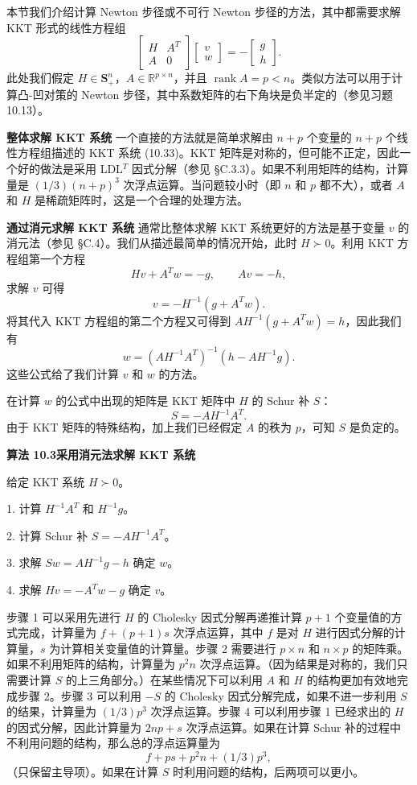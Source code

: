 \documentclass[UTF8,12pt,a4paper,fontset=fandol]{ctexart}
\begin{document}
本节我们介绍计算 Newton 步径或不可行 Newton 步径的方法，其中都需要求解 KKT 形式的线性方程组
\begin{equation}
\begin{bmatrix}
H&A^T\\
A&0
\end{bmatrix}
\begin{bmatrix}
v\\
w
\end{bmatrix}
=-
\begin{bmatrix}
g\\
h
\end{bmatrix}.
\tag{10.33}
\end{equation}
此处我们假定 $H\in\mathbf{S}_+^n$，$A\in\mathbb{R}^{p\times n}$，并且 $\operatorname{rank}A=p<n$。类似方法可以用于计算凸-凹对策的 Newton 步径，其中系数矩阵的右下角块是负半定的（参见习题 10.13）。

\noindent\textbf{整体求解 KKT 系统}\quad
一个直接的方法就是简单求解由 $n+p$ 个变量的 $n+p$ 个线性方程组描述的 KKT 系统 (10.33)。KKT 矩阵是对称的，但可能不正定，因此一个好的做法是采用 LDL$^T$ 因式分解（参见 \S C.3.3）。如果不利用矩阵的结构，计算量是 $(1/3)(n+p)^3$ 次浮点运算。当问题较小时（即 $n$ 和 $p$ 都不大），或者 $A$ 和 $H$ 是稀疏矩阵时，这是一个合理的处理方法。

\noindent\textbf{通过消元求解 KKT 系统}\quad
通常比整体求解 KKT 系统更好的方法是基于变量 $v$ 的消元法（参见 \S C.4）。我们从描述最简单的情况开始，此时 $H\succ 0$。利用 KKT 方程组第一个方程
\[
Hv+A^Tw=-g,\qquad Av=-h,
\]
求解 $v$ 可得
\[
v=-H^{-1}(g+A^Tw).
\]
将其代入 KKT 方程组的第二个方程又可得到 $AH^{-1}(g+A^Tw)=h$，因此我们有
\[
w=(AH^{-1}A^T)^{-1}(h-AH^{-1}g).
\]
这些公式给了我们计算 $v$ 和 $w$ 的方法。

在计算 $w$ 的公式中出现的矩阵是 KKT 矩阵中 $H$ 的 Schur 补 $S$：
\[
S=-AH^{-1}A^T.
\]
由于 KKT 矩阵的特殊结构，加上我们已经假定 $A$ 的秩为 $p$，可知 $S$ 是负定的。

\noindent\textbf{算法 10.3\quad 采用消元法求解 KKT 系统}

给定 KKT 系统 $H\succ0$。

1. 计算 $H^{-1}A^T$ 和 $H^{-1}g$。

2. 计算 Schur 补 $S=-AH^{-1}A^T$。

3. 求解 $Sw=AH^{-1}g-h$ 确定 $w$。

4. 求解 $Hv=-A^Tw-g$ 确定 $v$。

步骤 1 可以采用先进行 $H$ 的 Cholesky 因式分解再递推计算 $p+1$ 个变量值的方式完成，计算量为 $f+(p+1)s$ 次浮点运算，其中 $f$ 是对 $H$ 进行因式分解的计算量，$s$ 为计算相关变量值的计算量。步骤 2 需要进行 $p\times n$ 和 $n\times p$ 的矩阵乘。如果不利用矩阵的结构，计算量为 $p^2n$ 次浮点运算。（因为结果是对称的，我们只需要计算 $S$ 的上三角部分。）在某些情况下可以利用 $A$ 和 $H$ 的结构更加有效地完成步骤 2。步骤 3 可以利用 $-S$ 的 Cholesky 因式分解完成，如果不进一步利用 $S$ 的结果，计算量为 $(1/3)p^3$ 次浮点运算。步骤 4 可以利用步骤 1 已经求出的 $H$ 的因式分解，因此计算量为 $2np+s$ 次浮点运算。如果在计算 Schur 补的过程中不利用问题的结构，那么总的浮点运算量为
\[
f+ps+p^2n+(1/3)p^3,
\]
（只保留主导项）。如果在计算 $S$ 时利用问题的结构，后两项可以更小。
\end{document}
